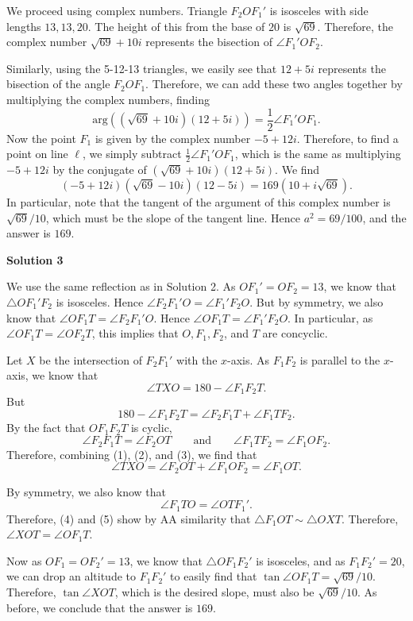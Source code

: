 \begin{enumerate}
 We proceed using complex numbers. Triangle $F_2OF_1'$ is isosceles with side lengths $13,13,20$. The height of this from the base of $20$ is $\sqrt{69}$. Therefore, the complex number $\sqrt{69}+10i$ represents the bisection of $\angle F_1'OF_2$.

 Similarly, using the 5-12-13 triangles, we easily see that $12+5i$ represents the bisection of the angle $F_2OF_1$. Therefore, we can add these two angles together by multiplying the complex numbers, finding
 \[\text{arg}\left((\sqrt{69}+10i)(12+5i)\right)=\frac{1}{2}\angle F_1'OF_1.\]Now the point $F_1$ is given by the complex number $-5+12i$. Therefore, to find a point on line $\ell$, we simply subtract $\frac{1}{2}\angle F_1'OF_1$, which is the same as multiplying $-5+12i$ by the conjugate of $(\sqrt{69}+10i)(12+5i)$. We find
 \[(-5+12i)(\sqrt{69}-10i)(12-5i)=169(10+i\sqrt{69}).\]In particular, note that the tangent of the argument of this complex number is $\sqrt{69}/10$, which must be the slope of the tangent line. Hence $a^2=69/100$, and the answer is $\boxed{169}$.

 



\textbf{Solution 3}

We use the same reflection as in Solution 2. As $OF_1'=OF_2=13$, we know that $\triangle OF_1'F_2$ is isosceles. Hence $\angle F_2F_1'O=\angle F_1'F_2O$. But by symmetry, we also know that $\angle OF_1T=\angle F_2F_1'O$. Hence $\angle OF_1T=\angle F_1'F_2O$. In particular, as $\angle OF_1T=\angle OF_2T$, this implies that $O, F_1, F_2$, and $T$ are concyclic.

 Let $X$ be the intersection of $F_2F_1'$ with the $x$-axis. As $F_1F_2$ is parallel to the $x$-axis, we know that 
 \[\angle TXO=180-\angle F_1F_2T.\tag{1}\] But 
 \[180-\angle F_1F_2T=\angle F_2F_1T+\angle F_1TF_2.\tag{2}\] By the fact that $OF_1F_2T$ is cyclic, 
 \[\angle F_2F_1T=\angle F_2OT\qquad\text{and}\qquad \angle F_1TF_2=\angle F_1OF_2.\tag{3}\] Therefore, combining (1), (2), and (3), we find that
 \[\angle TXO=\angle F_2OT+\angle F_1OF_2=\angle F_1OT.\tag{4}\]

 By symmetry, we also know that
 \[\angle F_1TO=\angle OTF_1'.\tag{5}\]Therefore, (4) and (5) show by AA similarity that $\triangle F_1OT\sim \triangle OXT$. Therefore, $\angle XOT=\angle OF_1T$.

 Now as $OF_1=OF_2'=13$, we know that $\triangle OF_1F_2'$ is isosceles, and as $F_1F_2'=20$, we can drop an altitude to $F_1F_2'$ to easily find that $\tan \angle OF_1T=\sqrt{69}/10$. Therefore, $\tan\angle XOT$, which is the desired slope, must also be $\sqrt{69}/10$. As before, we conclude that the answer is $\boxed{169}$.


\end{enumerate}
